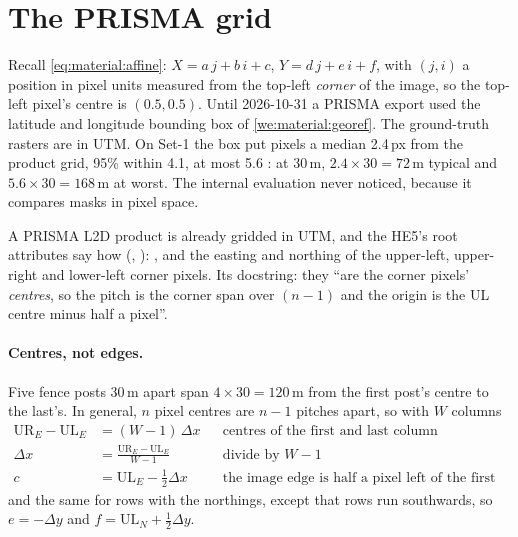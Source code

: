 \section{The PRISMA grid}\label{sec:submission:grid}

Recall \cref{eq:material:affine}: $X=a\,j+b\,i+c$, $Y=d\,j+e\,i+f$, with $(j,i)$ a position in pixel units measured from
the top-left \emph{corner} of the image, so the top-left pixel's centre is $(0.5,0.5)$. Until 2026-10-31 a PRISMA export
used the latitude and longitude bounding box of \cref{we:material:georef}. The ground-truth rasters are in UTM. On Set-1
the box put pixels a median 2.4\,px from the product grid, 95\% within 4.1, at most 5.6
: at 30\,m, $2.4\times30=72$\,m typical and $5.6\times30=168$\,m at
worst. The internal evaluation never noticed, because it compares masks in pixel space.

A PRISMA L2D product is already gridded in UTM, and the HE5's root attributes say how (,
): , and the easting and northing of the upper-left, upper-right and
lower-left corner pixels. Its docstring: they ``are the corner pixels' \emph{centres}, so the pitch is the corner span
over $(n-1)$ and the origin is the UL centre minus half a pixel''.

\paragraph{Centres, not edges.} Five fence posts 30\,m apart span $4\times30=120$\,m from the first post's centre to the
last's. In general, $n$ pixel centres are $n-1$ pitches apart, so with $W$ columns
\begin{align*}
\text{UR}_E-\text{UL}_E &= (W-1)\,\Delta x &&\text{centres of the first and last column}\\
\Delta x &= \frac{\text{UR}_E-\text{UL}_E}{W-1} &&\text{divide by } W-1\\
c &= \text{UL}_E-\tfrac12\Delta x &&\text{the image edge is half a pixel left of the first centre,}
\end{align*}
and the same for rows with the northings, except that rows run southwards, so $e=-\Delta y$ and
$f=\text{UL}_N+\tfrac12\Delta y$.

